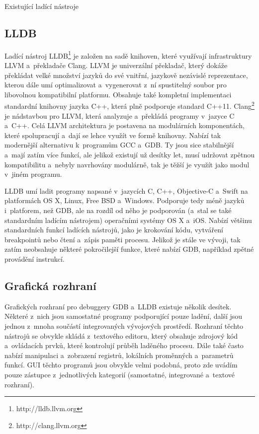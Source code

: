 \documentclass[czech,bachelor,male,python,dept460,hidelinks]{diploma}						%
\newcommand{\parspace}[1][]{
	\ifthenelse{\isempty{#1}}{\vspace{0mm}}{\vspace{#1}}
	\par
}
\begin{document}
\begin{section}{Existující ladící nástroje}
	\subsection{LLDB}
		Ladící nástroj LLDB\footnote{http://lldb.llvm.org} je založen na sadě knihoven, které využívají infrastruktury LLVM a~překladače Clang.
		LLVM je univerzální překladač, který dokáže překládat velké množství jazyků do své vnitřní, jazykově nezávislé reprezentace, kterou dále umí
		optimalizovat a~vygenerovat z~ní spustitelný soubor pro libovolnou kompatibilní platformu. Obsahuje také kompletní implementaci standardní
		knihovny jazyka C++, která plně podporuje standard C++11. Clang\footnote{http://clang.llvm.org} je nádstavbou pro LLVM, která analyzuje
		a~překládá programy v~jazyce C a~C++. Celá LLVM architektura je postavena na modulárních komponentách, které spolupracují a~dají se lehce využít ve
		formě knihovny. Nabízí tak modernější alternativu k~programům GCC a~GDB. Ty jsou sice stabilnější a~mají zatím více funkcí, ale jelikož existují už
		desítky let, musí udržovat zpětnou kompatibilitu a~nebyly navrhovány modulárně, tak je těžší je využít jako modul v~jiném programu.
		
		\parspace LLDB umí ladit programy napsané v~jazycích C, C++, Objective-C a~Swift na platformách OS X, Linux, Free BSD a~Windows. Podporuje tedy méně jazyků
		i~platforem, než GDB, ale na rozdíl od něho je podporován (a~stal se také standardním ladícím nástrojem) operačními systémy OS X a~iOS.
		Nabízí většinu standardních funkcí ladících nástrojů, jako je krokování kódu, vytváření breakpointů nebo čtení a~zápis paměti procesu.
		Jelikož je stále ve vývoji, tak zatím neobsahuje některé pokročilejší funkce, které nabízí GDB, například zpětné provádění instrukcí.

	\subsection{Grafická rozhraní}
		Grafických rozhraní pro debuggery GDB a~LLDB existuje několik desítek. Některé z~nich jsou samostatné programy podporující pouze ladění, další jsou
		jednou z~mnoha součástí integrovaných vývojových prostředí. Rozhraní těchto nástrojů se obvykle skládá z~textového editoru, který obsahuje zdrojový kód
		a~ovládacích prvků, které kontrolují průběh laděného procesu. Dále také často nabízí manipulaci a~zobrazení registrů, lokálních proměnných a~parametrů
		funkcí. GUI těchto programů jsou obvykle velmi podobná, proto zde uvádím pouze zástupce z~jednotlivých kategorií (samostatné, integrované a~textové rozhraní).


\end{section}
\end{document}
